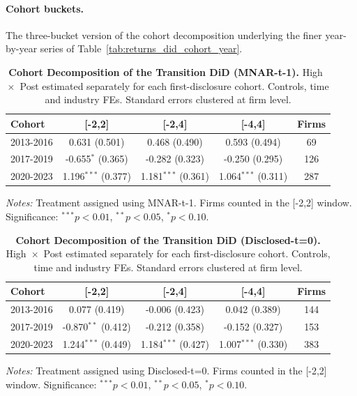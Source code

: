 \documentclass[a4paper,12pt]{article}
\begin{document}
\clearpage

\paragraph{Cohort buckets.} The three-bucket version of the cohort decomposition
underlying the finer year-by-year series of Table~\ref{tab:returns_did_cohort_year}.

\begin{table}[htbp]
\footnotesize\centering
\caption{\textbf{Cohort Decomposition of the Transition DiD (MNAR-t-1).}
High~$\times$~Post estimated separately for each first-disclosure cohort.
Controls, time and industry FEs. Standard errors clustered at firm level.}
\label{tab:returns_did_cohort_mnar}
\begin{tabular}{lcccc}
\toprule
Cohort & [-2,2] & [-2,4] & [-4,4] & Firms \\
\midrule
2013-2016 & 0.631 (0.501) & 0.468 (0.490) & 0.593 (0.494) & 69 \\
2017-2019 & -0.655$^{*}$ (0.365) & -0.282 (0.323) & -0.250 (0.295) & 126 \\
2020-2023 & 1.196$^{***}$ (0.377) & 1.181$^{***}$ (0.361) & 1.064$^{***}$ (0.311) & 287 \\
\bottomrule
\end{tabular}
\begin{flushleft}\footnotesize
\textit{Notes:} Treatment assigned using MNAR-t-1. Firms counted in the [-2,2] window. Significance: $^{***}p<0.01$, $^{**}p<0.05$, $^{*}p<0.10$.
\end{flushleft}
\end{table}

\begin{table}[htbp]
\footnotesize\centering
\caption{\textbf{Cohort Decomposition of the Transition DiD (Disclosed-t=0).}
High~$\times$~Post estimated separately for each first-disclosure cohort.
Controls, time and industry FEs. Standard errors clustered at firm level.}
\label{tab:returns_did_cohort_disc}
\begin{tabular}{lcccc}
\toprule
Cohort & [-2,2] & [-2,4] & [-4,4] & Firms \\
\midrule
2013-2016 & 0.077 (0.419) & -0.006 (0.423) & 0.042 (0.389) & 144 \\
2017-2019 & -0.870$^{**}$ (0.412) & -0.212 (0.358) & -0.152 (0.327) & 153 \\
2020-2023 & 1.244$^{***}$ (0.449) & 1.184$^{***}$ (0.427) & 1.007$^{***}$ (0.330) & 383 \\
\bottomrule
\end{tabular}
\begin{flushleft}\footnotesize
\textit{Notes:} Treatment assigned using Disclosed-t=0. Firms counted in the [-2,2] window. Significance: $^{***}p<0.01$, $^{**}p<0.05$, $^{*}p<0.10$.
\end{flushleft}
\end{table}
\end{document}
